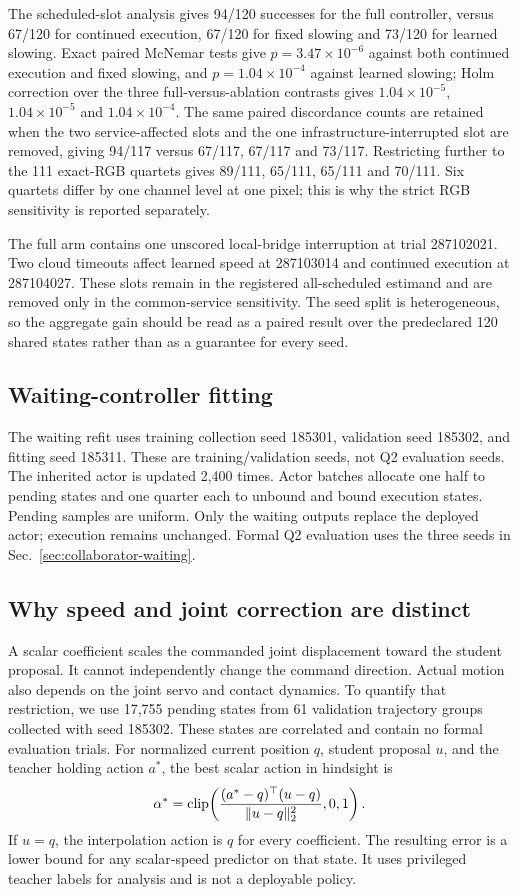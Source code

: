 The scheduled-slot analysis gives 94/120 successes for the full controller, versus 67/120 for continued execution, 67/120 for fixed slowing and 73/120 for learned slowing. Exact paired McNemar tests give $p=3.47\times10^{-6}$ against both continued execution and fixed slowing, and $p=1.04\times10^{-4}$ against learned slowing; Holm correction over the three full-versus-ablation contrasts gives $1.04\times10^{-5}$, $1.04\times10^{-5}$ and $1.04\times10^{-4}$. The same paired discordance counts are retained when the two service-affected slots and the one infrastructure-interrupted slot are removed, giving 94/117 versus 67/117, 67/117 and 73/117. Restricting further to the 111 exact-RGB quartets gives 89/111, 65/111, 65/111 and 70/111. Six quartets differ by one channel level at one pixel; this is why the strict RGB sensitivity is reported separately.

The full arm contains one unscored local-bridge interruption at trial 287102021. Two cloud timeouts affect learned speed at 287103014 and continued execution at 287104027. These slots remain in the registered all-scheduled estimand and are removed only in the common-service sensitivity. The seed split is heterogeneous, so the aggregate gain should be read as a paired result over the predeclared 120 shared states rather than as a guarantee for every seed.

\subsection{Waiting-controller fitting}
The waiting refit uses training collection seed 185301, validation seed 185302, and fitting seed 185311. These are training/validation seeds, not Q2 evaluation seeds. The inherited actor is updated 2,400 times. Actor batches allocate one half to pending states and one quarter each to unbound and bound execution states. Pending samples are uniform. Only the waiting outputs replace the deployed actor; execution remains unchanged. Formal Q2 evaluation uses the three seeds in Sec.~\ref{sec:collaborator-waiting}.

\subsection{Why speed and joint correction are distinct}
A scalar coefficient scales the commanded joint displacement toward the student proposal. It cannot independently change the command direction. Actual motion also depends on the joint servo and contact dynamics. To quantify that restriction, we use 17,755 pending states from 61 validation trajectory groups collected with seed 185302. These states are correlated and contain no formal evaluation trials. For normalized current position $q$, student proposal $u$, and the teacher holding action $a^*$, the best scalar action in hindsight is
\begin{equation}
 \alpha^*=\operatorname{clip}\!\left(\frac{(a^*-q)^\top(u-q)}{\|u-q\|_2^2},0,1\right).
\end{equation}
If $u=q$, the interpolation action is $q$ for every coefficient. The resulting error is a lower bound for any scalar-speed predictor on that state. It uses privileged teacher labels for analysis and is not a deployable policy.

